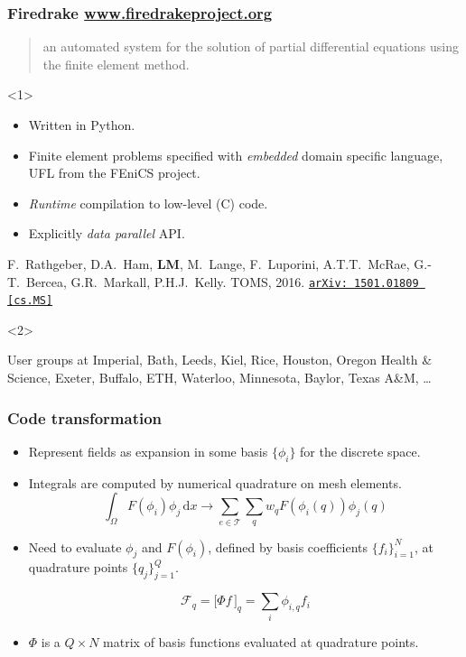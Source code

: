 \documentclass[presentation]{beamer}
\newcommand{\arxivlink}[2]{%
  \href{http://www.arxiv.org/abs/#1}%
  {\texttt{arXiv:\,#1\,[#2]}}%
}
\begin{document}
\begin{frame}
  \frametitle{Firedrake \url{www.firedrakeproject.org}}

  \begin{quote}
    {\normalfont [\ldots]} an automated system for the solution of partial
    differential equations using the finite element method.
  \end{quote}

  \begin{onlyenv}<1>
    \begin{itemize}
    \item Written in Python.
    \item Finite element problems specified with \emph{embedded}
      domain specific language, UFL \parencite{Alnaes:2014} from the
      FEniCS project.
    \item \emph{Runtime} compilation to low-level (C) code.
    \item Explicitly \emph{data parallel} API.
    \end{itemize}

    \begin{flushright}
      {\scriptsize F.~Rathgeber, D.A.~Ham, \textbf{LM}, M.~Lange,
        F.~Luporini, A.T.T.~McRae, G.-T.~Bercea, G.R.~Markall,
        P.H.J.~Kelly. TOMS,
        2016. \arxivlink{1501.01809}{cs.MS}\nocite{Rathgeber:2016}}
    \end{flushright}
  \end{onlyenv}
  \begin{onlyenv}<2>
    \begin{block}{User groups at}
      Imperial, Bath, Leeds, Kiel, Rice, Houston, Oregon Health \&
      Science, Exeter, Buffalo, ETH, Waterloo, Minnesota, Baylor,
      Texas A\&M, \dots
    \end{block}
  \end{onlyenv}
\end{frame}


\begin{frame}
  \frametitle{Code transformation}
  \begin{itemize}
  \item Represent fields as expansion in some basis $\{\phi_i\}$ for
    the discrete space.
  \item Integrals are computed by numerical quadrature on mesh elements.
    \begin{equation*}
      \int_\Omega F(\phi_i) \phi_j \,\text{d}x \rightarrow \sum_{e \in
        \mathcal{T}} \sum_q w_q F(\phi_i(q)) \phi_j(q)
    \end{equation*}
    \item Need to evaluate $\phi_j$ and $F(\phi_i)$, defined by basis coefficients
      $\{f_i\}_{i=1}^{N}$, at quadrature points $\{q_j\}_{j=1}^{Q}$.

    \begin{equation*}
      \mathcal{F}_q = \big[\Phi f\,\big]_q = \sum_i \phi_{i,q} f_i
    \end{equation*}
  \item $\Phi$ is a $Q\times N$ matrix of basis functions evaluated at
    quadrature points.
  \end{itemize}
\end{frame}
\end{document}
